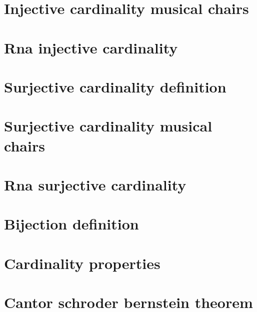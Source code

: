 \section*{Injective cardinality musical chairs}

\vfill
\section*{Rna injective cardinality}

\vfill
\section*{Surjective cardinality definition}

\vfill
\section*{Surjective cardinality musical chairs}

\vfill
\section*{Rna surjective cardinality}

\vfill
\section*{Bijection definition}

\vfill
\section*{Cardinality properties}

\vfill
\section*{Cantor schroder bernstein theorem}

\vfill
